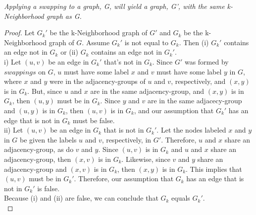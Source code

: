 \begin{thm}  \emph{Applying a swapping to a graph, G, will yield a graph, G', with the same k-Neighborhood graph as G.}
\end{thm}
\begin{proof}
\noindent Let $G_k'$ be the k-Neighborhood graph of $G'$ and $G_k$ be the k-Neighborhood graph of $G$. Assume $G_k'$ is not equal to $G_k$. Then (i) $G_k'$ contains an edge not in $G_k$ or (ii) $G_k$ contains an edge not in $G_k'$.  \\

\indent i) Let $(u,v)$ be an edge in $G_k'$ that's not in $G_k$. Since $G'$ was formed by $swappings$ on $G$, $u$ must have some label $x$ and $v$ must have some label $y$ in $G$, where $x$ and $y$ were in the adjacency-groups of $u$ and $v$, respectively, and $(x,y)$ is in $G_k$. But, since $u$ and $x$ are in the same adjacency-group, and $(x,y)$ is in $G_k$, then $(u,y)$ must be in $G_k$. Since $y$ and $v$ are in the same adjacecy-group and $(u,y)$ is in $G_k$, then $(u,v)$ is in $G_k$, and our assumption that $G_k'$ has an edge that is not in $G_k$ must be false.\\
\indent 			ii) Let $(u,v)$ be an edge in $G_k$ that is not in $G_k'.$ Let the nodes labeled $x$ and $y$ in $G$ be given the labels $u$ and $v$, respectively, in $G'$. Therefore, $u$ and $x$ share an adjacency-group, as do $v$ and $y$.  Since $(u,v)$ is in $G_k$ and $u$ and $x$ share an adjacency-group, then $(x,v)$ is in $G_k$. Likewise, since $v$ and $y$ share an adjacency-group and $(x,v)$ is in $G_k$, then $(x,y)$ is in $G_k$. This implies that $(u,v)$ must be in $G_k'$. Therefore, our assumption that $G_k$ has an edge that is not in $G_k'$ is false. \\
\indent Because (i) and (ii) are false, we can conclude that $G_k$ equals $G_k'$.\\
\end{proof}
